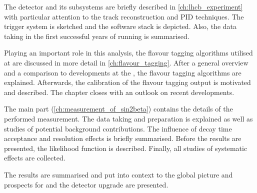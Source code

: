 The \LHCb detector and its subsystems are briefly described in
\cref{ch:lhcb_experiment} with particular attention to the track reconstruction
and \acl{PID} techniques. The \LHCb trigger system is sketched and the software
stack is depicted. Also, the data taking in the first successful years
of running is summarised.

Playing an important role in this analysis, the flavour tagging algorithms
utilised at \LHCb are discussed in more detail in \cref{ch:flavour_tagging}.
After a general overview and a comparison to developments at the \BFactories,
the flavour tagging algorithms are explained. Afterwards, the calibration of the
flavour tagging output is motivated and described. The chapter closes with an
outlook on recent developments.

The main part (\cref{ch:measurement_of_sin2beta}) contains the details of the
performed measurement. The data taking and preparation is explained as well as
studies of potential background contributions. The influence of decay time
acceptance and resolution effects is briefly summarised. Before the results are
presented, the likelihood function is described. Finally, all studies of
systematic effects are collected.

The results are summarised and put into context to the global \CKM picture and
prospects for \RunTwo and the \LHCb detector upgrade are presented.

